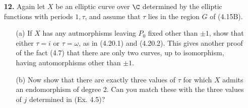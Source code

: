 \documentclass[a4paper]{article}
\begin{document}
\begin{enumerate} [label=\textbf{\arabic*.}, leftmargin=0em]
\begin{proof}
\begin{itemize} [leftmargin=0cm]
                  \item[(c)] The ring of integers of $\Q(\sqrt{-d})$ is given by
                        \begin{equation*}
                            \begin{cases*}
                                \Z[\sqrt{-d}]                          & $d \equiv 1, 2 \mod{4}$ \\
                                \Z\bigg[\cfrac{1 + \sqrt{-d}}{2}\bigg] & $d \equiv 3 \mod{4}$
                            \end{cases*}.
                        \end{equation*}
                        By (4.19), if $\tau = r + s \sqrt{-d}$ for some $r, s \in \Q$, the endomorphism ring $R$ is
                        \begin{equation*}
                            R = \{ a + b \tau \mid a, b \in \Z, \quad 2br, b(r^2 + ds^2) \in \Z \}.
                        \end{equation*}
                        Suppose $\tau$ is integral over $\Z$.
                        If $d \equiv 1, 2 \mod{4}$, then $r, s \in \Z$, so $a + b \tau \in R$ for all $a, b \in \Z$.
                        If $d \equiv 3 \mod{4}$, then we can write $\tau = (r' + s'\sqrt{-d}) / 2$ with $r', s' \in \Z$ such that $r' \equiv s' \mod{2}$.
                        For any $b \in \Z$, the first condition $2br = br' \in \Z$ is easily satisfied.
                        Also, we have
                        $$r^2 + ds^2 = \frac{r'^2 + ds'^2}{4} \in \Z$$ for all $b \in \Z$ since $r'^2, s'^2 \equiv 0, 1 \mod{4}$.
                        Hence, $R = \Z[\tau]$.
              \end{itemize}
          \end{proof}

    \item[\textbf{12.}] Again let $X$ be an elliptic curve over $\C$ determined by the elliptic functions with periods $1, \tau$, and assume that $\tau$ lies in the region $G$ of (4.15B).

          \begin{itemize}
              \item[(a)] If $X$ has any autmorphisms leaving $P_0$ fixed other than $\pm 1$, show that either $\tau = i$ or $\tau = \omega$, as in (4.20.1) and (4.20.2).
                    This gives another proof of the fact (4.7) that there are only two curves, up to isomorphism, having automorphisms other than $\pm 1$.
              \item[(b)] Now show that there are exactly three values of $\tau$ for which $X$ admits an endomorphism of degree 2.
                    Can you match these with the three values of $j$ determined in (Ex. 4.5)?
          \end{itemize}


\end{enumerate}
\end{document}
